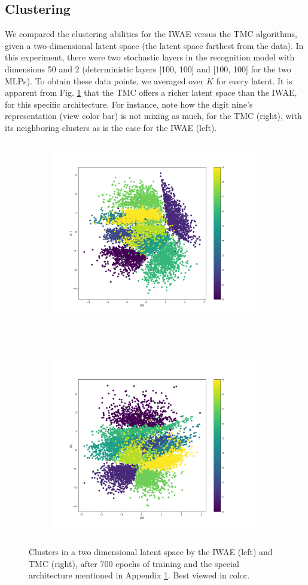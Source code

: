 \begin{appendices}
\section{Clustering}
\label{sec:clusters}
We compared the clustering abilities for the IWAE versus the TMC algorithms, given a two-dimensional latent space (the latent space farthest from the data). In this experiment, there were two stochastic layers in the recognition model with dimensions 50 and 2 (deterministic layers [100, 100] and [100, 100] for the two MLPs). To obtain these data points, we averaged over $K$ for every latent. It is apparent from Fig. \ref{fig:clusters} that the TMC offers a richer latent space than the IWAE, for this specific architecture. For instance, note how the digit nine's representation (view color bar) is not mixing as much, for the TMC (right), with its neighboring clusters as is the case for the IWAE (left).
\begin{figure}[h!]
    \centering
    \begin{subfigure}[t]{0.5\textwidth}
    \hspace*{-2cm}
        \centering
        \includegraphics[height=8cm]{Figures/Scatter_plot_iwae.png}
    \end{subfigure}%
    ~ 
    \begin{subfigure}[t]{0.5\textwidth}
        \centering
        \includegraphics[height=8cm]{Figures/Scatter_plot_tmc.png}
    \end{subfigure}
    \caption{Clusters in a two dimensional latent space by the IWAE (left) and TMC (right), after 700 epochs of training and the special architecture mentioned in Appendix \ref{sec:clusters}. Best viewed in color. }
    \label{fig:clusters}
\end{figure}
\end{appendices}